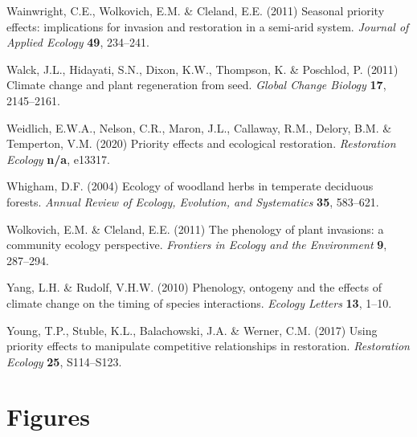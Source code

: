 \documentclass{article}[11pt]
\begin{document}
\begin{thebibliography}{62}
Wainwright, C.E., Wolkovich, E.M. \& Cleland, E.E. (2011) Seasonal priority
  effects: implications for invasion and restoration in a semi-arid system.
  \emph{Journal of Applied Ecology} \textbf{49}, 234--241.

Walck, J.L., Hidayati, S.N., Dixon, K.W., Thompson, K. \& Poschlod, P. ({2011})
  {Climate change and plant regeneration from seed}. \emph{Global Change
  Biology} \textbf{{17}}, {2145--2161}.

Weidlich, E.W.A., Nelson, C.R., Maron, J.L., Callaway, R.M., Delory, B.M. \&
  Temperton, V.M. (2020) Priority effects and ecological restoration.
  \emph{Restoration Ecology} \textbf{n/a}, e13317.

Whigham, D.F. (2004) Ecology of woodland herbs in temperate deciduous forests.
  \emph{Annual Review of Ecology, Evolution, and Systematics} \textbf{35},
  583--621.

Wolkovich, E.M. \& Cleland, E.E. (2011) The phenology of plant invasions: a
  community ecology perspective. \emph{Frontiers in Ecology and the
  Environment} \textbf{9}, 287--294.

Yang, L.H. \& Rudolf, V.H.W. (2010) Phenology, ontogeny and the effects of
  climate change on the timing of species interactions. \emph{Ecology Letters}
  \textbf{13}, 1--10.

Young, T.P., Stuble, K.L., Balachowski, J.A. \& Werner, C.M. (2017) Using
  priority effects to manipulate competitive relationships in restoration.
  \emph{Restoration Ecology} \textbf{25}, S114--S123.

\end{thebibliography}

\section*{Figures}
\end{document}
